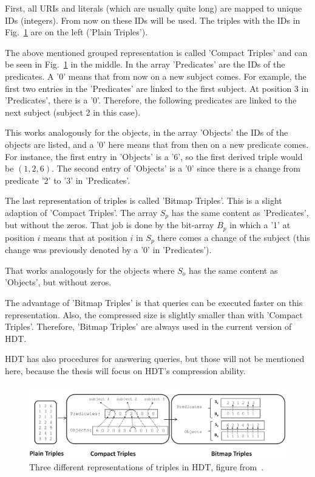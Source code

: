 First, all URIs and literals (which are usually quite long) are mapped to unique IDs (integers). From now on these IDs will be used. The triples with the IDs in Fig.~\ref{fig:hdt_overview} are on the left ('Plain Triples'). 

The above mentioned grouped representation is called 'Compact Triples' and can be seen in Fig.~\ref{fig:hdt_overview} in the middle. In the array 'Predicates' are the IDs of the predicates. A '0' means that from now on a new subject comes. For example, the first two entries in the 'Predicates' are linked to the first subject. At position 3 in 'Predicates', there is a '0'. Therefore, the following predicates are linked to the next subject (subject 2 in this case).

This works analogously for the objects, in the array 'Objects' the IDs of the objects are listed, and a '0' here means that from then on a new predicate comes. For instance, the first entry in 'Objects' is a '6', so the first derived triple would be $(1,2,6)$. The second entry of 'Objects' is a '0' since there is a change from predicate '2' to '3' in 'Predicates'.

The last representation of triples is called 'Bitmap Triples'.  This is a slight adaption of 'Compact Triples'. The array $S_p$ has the same content as 'Predicates', but without the zeros. That job is done by the bit-array $B_p$ in which a '1' at position $i$ means that at position $i$ in $S_p$ there comes a change of the subject (this change was previously denoted by a '0' in 'Predicates'). 

That works analogously for the objects where $S_o$ has the same content as 'Objects', but without zeros.

The advantage of 'Bitmap Triples' is that queries can be executed faster on this representation. Also, the compressed size is slightly smaller than with 'Compact Triples'. Therefore, 'Bitmap Triples' are always used in the current version of HDT.

HDT has also procedures for answering queries, but those will not be mentioned here, because the thesis will focus on HDT's compression ability.


\begin{figure}[h]
	\centering
	\includegraphics[width=1\textwidth]{figures/relatedwork/hdt1}
	\caption{Three different representations of triples in HDT, figure from~\cite{hdt}.}
	\label{fig:hdt_overview}
\end{figure}


